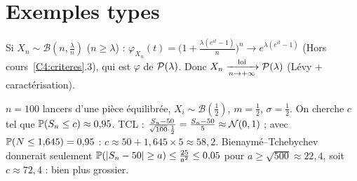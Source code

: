 \documentclass[11pt,a4paper]{article}
\begin{document}
\section*{Exemples types}

\begin{exemple}\label{C4:ex-binom}
Si $X_n\sim\mathcal B(n,\frac{\lambda}{n})$ ($n\ge\lambda$) : $\varphi_{X_n}(t)=\bigl(1+\frac{\lambda(e^{it}-1)}{n}\bigr)^n\to e^{\lambda(e^{it}-1)}$
(Hors cours~\ref{C4:criteres}.3), qui est $\varphi$ de $\mathcal{P}(\lambda)$. Donc $X_n\xrightarrow[n\to+\infty]{\text{loi}}\mathcal{P}(\lambda)$ (Lévy + caractérisation).
\end{exemple}

\begin{exemple}\label{C4:ex-TCL}
$n=100$ lancers d'une pièce équilibrée, $X_i\sim\mathcal B(\frac12)$, $m=\frac12$, $\sigma=\frac12$. On cherche $c$ tel que
$\mathbb{P}(S_n\le c)\approx0{,}95$. TCL : $\frac{S_n-50}{\sqrt{100}\cdot\frac12}=\frac{S_n-50}{5}\approx\mathcal{N}(0,1)$ ;
avec $\mathbb{P}(N\le1{,}645)=0{,}95$ : $c\approx50+1{,}645\times5\approx58{,}2$.
Bienaymé--Tchebychev donnerait seulement $\mathbb{P}(|S_n-50|\ge a)\le\frac{25}{a^2}\le0{,}05$ pour $a\ge\sqrt{500}\approx22{,}4$, soit $c\approx72{,}4$ :
bien plus grossier.
\end{exemple}
\end{document}
